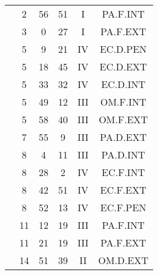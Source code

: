 \documentclass[12pt, a4paper]{article}
\begin{document}
\begin{multicols}{3}
{\begin{tabular}{c c c c c c}
	 	 	 	 & 2 & 56 & 51 & I & PA.F.INT\\%
	 	 	 	 & 3 & 0 & 27 & I & PA.F.EXT\\%
	 	 	 	 & 5 & 9 & 21 & IV & EC.D.PEN\\%
	 	 	 	 & 5 & 18 & 45 & IV & EC.D.EXT\\%
	 	 	 	 & 5 & 33 & 32 & IV & EC.D.INT\\%
	 	 	 	 & 5 & 49 & 12 & III & OM.F.INT\\%
	 	 	 	 & 5 & 58 & 40 & III & OM.F.EXT\\%
	 	 	 	 & 7 & 55 & 9 & III & PA.D.EXT\\%
	 	 	 	 & 8 & 4 & 11 & III & PA.D.INT\\%
	 	 	 	 & 8 & 28 & 2 & IV & EC.F.INT\\%
	 	 	 	 & 8 & 42 & 51 & IV & EC.F.EXT\\%
	 	 	 	 & 8 & 52 & 13 & IV & EC.F.PEN\\%
	 	 	 	 & 11 & 12 & 19 & III & PA.F.INT\\%
	 	 	 	 & 11 & 21 & 19 & III & PA.F.EXT\\%
	 	 	 	 & 14 & 51 & 39 & II & OM.D.EXT\\%
	 	 \end{tabular}
 	}
\end{multicols}
\end{document}
